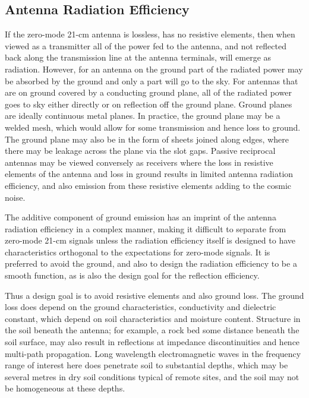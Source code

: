 \subsection{Antenna Radiation Efficiency}

   If the zero-mode 21-cm antenna is lossless, has no resistive elements, then when viewed as a transmitter all of the power fed to the antenna, and not reflected back along the transmission line at the antenna terminals, will emerge as radiation.  However, for an antenna on the ground part of the radiated power may be absorbed by the ground and only a part will go to the sky.  For antennas that are on ground covered by a conducting ground plane, all of the radiated power goes to sky either directly or on reflection off the ground plane. Ground planes are ideally continuous metal planes.  In practice, the ground plane may be a welded mesh, which would allow for some transmission and hence loss to ground.  The ground plane may also be in the form of sheets joined along edges, where there may be leakage across the plane via the slot gaps.  Passive reciprocal antennas may be viewed conversely as receivers where the loss in resistive elements of the antenna and loss in ground results in limited antenna radiation efficiency, and also emission from these resistive elements adding to the cosmic noise.  
   
   The additive component of ground emission has an imprint of the antenna radiation efficiency in a complex manner, making it difficult to separate from zero-mode 21-cm signals unless the radiation efficiency itself is designed to have characteristics orthogonal to the expectations for zero-mode signals.  It is preferred to avoid the ground, and also to design the radiation efficiency to be a smooth function, as is also the design goal for the reflection efficiency.
   
   Thus a design goal is to avoid resistive elements and also ground loss.  The ground loss does depend on the ground characteristics, conductivity and dielectric constant, which depend on soil characteristics and moisture content.  Structure in the soil beneath the antenna; for example, a rock bed some distance beneath the soil surface, may also result in reflections at impedance discontinuities and hence multi-path propagation.  Long wavelength electromagnetic waves in the frequency range of interest here does penetrate soil to substantial depths, which may be several metres in dry soil conditions typical of remote sites, and the soil may not be homogeneous at these depths.
   
